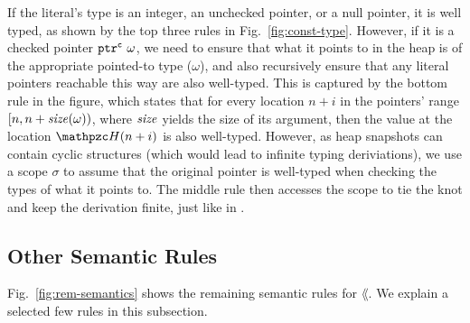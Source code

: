 If the literal's type is an integer, an unchecked pointer, or a null
pointer, it is well typed, as shown by the top three rules in
Fig.~\ref{fig:const-type}. However, if it is a checked pointer
$\mathtt{ptr}^{\texttt{c}}~{\omega}$, we need to ensure that what it points to in
the heap is of the appropriate pointed-to type ($\omega$), and also
recursively ensure that any literal pointers reachable this way are
also well-typed. This is captured by the bottom rule in the figure,
which states that for every location $n+i$ in the pointers' range
%
$[n, n+\mathit{size}(\omega))$, where $\mathit{size}$ yields the size of its argument,
  then the value at the location $\heap(n+i)$ is also well-typed.
  However, as heap snapshots can contain cyclic structures (which
  would lead to infinite typing deriviations), we use a scope $\sigma$
  to assume that the original pointer is well-typed when checking the
  types of what it points to. The middle rule then accesses the scope
  to tie the knot and keep the derivation finite, just like in
  \citet{ruef18checkedc-incr}.

\subsection{Other Semantic Rules}\label{sec:rem-semantics}

Fig.~\ref{fig:rem-semantics} shows the remaining semantic rules for
$\lang$. We explain a selected few rules in this subsection.

